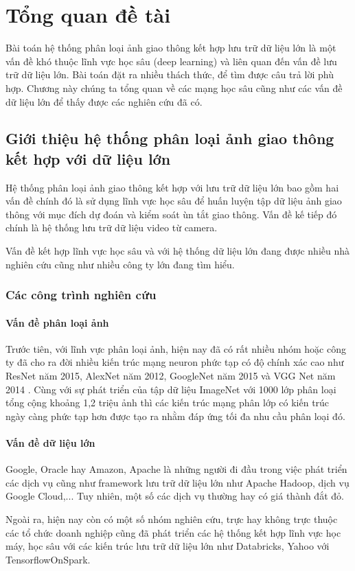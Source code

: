 \chapter{Tổng quan đề tài}
Bài toán hệ thống phân loại ảnh giao thông kết hợp lưu trữ dữ liệu lớn là một vấn đề khó thuộc lĩnh vực học sâu (deep learning) và liên quan đến vấn đề lưu trữ dữ liệu lớn. Bài toán đặt ra nhiều thách thức, để tìm được câu trả lời phù hợp. Chương này chúng ta tổng quan về các mạng học sâu cũng như các vấn đề dữ liệu lớn để thấy được các nghiên cứu đã có.
\section{Giới thiệu hệ thống phân loại ảnh giao thông kết hợp với dữ liệu lớn}
Hệ thống phân loại ảnh giao thông kết hợp với lưu trữ dữ liệu lớn bao gồm hai vấn đề chính đó là sử dụng lĩnh vực học sâu để huấn luyện tập dữ liệu ảnh giao thông với mục đích dự đoán và kiểm soát ùn tắt giao thông. Vấn đề kế tiếp đó chính là hệ thống lưu trữ dữ liệu video từ camera.\par 
Vấn đề kết hợp lĩnh vực học sâu và với hệ thống dữ liệu lớn đang được nhiều nhà nghiên cứu cũng như nhiều công ty lớn đang tìm hiểu.
\subsection{Các công trình nghiên cứu}
\subsubsection*{Vấn đề phân loại ảnh}
Trước tiên, với lĩnh vực phân loại ảnh, hiện nay đã có rất nhiều nhóm hoặc công ty đã cho ra đời nhiều kiến trúc mạng neuron phức tạp có độ chính xác cao như ResNet\cite{resnet} năm 2015, AlexNet\cite{alex} năm 2012, GoogleNet\cite{1} năm 2015 và VGG Net năm 2014 \cite{vgg} . Cùng với sự phát triển của tập dữ liệu ImageNet với 1000 lớp phân loại tổng cộng khoảng 1,2 triệu ảnh thì các kiến trúc mạng phân lớp có kiến trúc ngày càng phức tạp hơn được tạo ra nhằm đáp ứng tối đa nhu cầu phân loại đó.\par

\subsubsection*{Vấn đề dữ liệu lớn}
Google, Oracle hay Amazon, Apache là những người đi đầu trong việc phát triển các dịch vụ cũng như framework lưu trữ dữ liệu lớn như Apache Hadoop, dịch vụ Google Cloud,... Tuy nhiên, một số các dịch vụ thường hay có giá thành đắt đỏ.\par 
Ngoài ra, hiện nay còn có một số nhóm nghiên cứu, trực hay không trực thuộc các tổ chức doanh nghiệp cũng đã phát triển các hệ thống kết hợp lĩnh vực học máy, học sâu với các kiến trúc lưu trữ dữ liệu lớn như Databricks, Yahoo với TensorflowOnSpark.\par 

